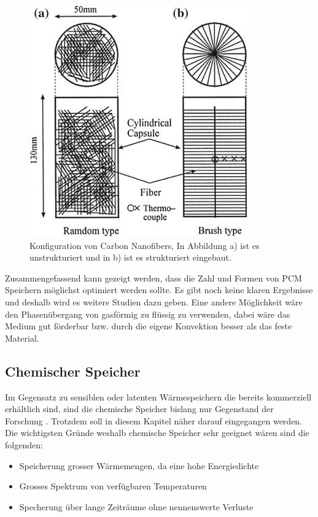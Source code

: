 \documentclass[11pt,a4paper]{scrartcl}
\begin{document}
\begin{figure}[h!]
\begin{center}
\includegraphics[scale=0.5]{images/configurationofthecarbonnanofibers.jpg}
\caption{Konfiguration von Carbon Nanofibers, In Abbildung a) ist es unstrukturiert und in b) ist es strukturiert eingebaut. \cite{WasteEnergyHarvesting}}
\label{fig:configurationofthecarbonnanofibers}
\end{center}
\end{figure}

Zusammengefassend kann gezeigt werden, dass die Zahl und Formen von PCM
Speichern möglichst optimiert werden sollte. Es gibt noch keine klaren
Ergebnisse und deshalb wird es weitere Studien dazu geben.
Eine andere Möglichkeit wäre den Phasenübergang von gasförmig zu flüssig zu
verwenden, dabei wäre das Medium gut förderbar bzw. durch
die eigene Konvektion besser als das feste Material.


\subsection{Chemischer Speicher}
Im Gegensatz zu sensiblen oder latenten Wärmespeichern die
bereits kommerziell erhältlich sind, sind die chemische Speicher bislang nur
Gegenstand der Forschung \cite{gegenstandderforschung}. Trotzdem soll in
diesem Kapitel näher darauf eingegangen werden. Die wichtigsten Gründe weshalb
chemische Speicher sehr geeignet wären sind die folgenden:
\begin{itemize}
\item Speicherung grosser Wärmemengen, da eine hohe Energiedichte 
\item Grosses Spektrum von verfügbaren Temperaturen
\item Specherung über lange Zeiträume ohne nennenswerte Verluste
\end{itemize}
\end{document}
